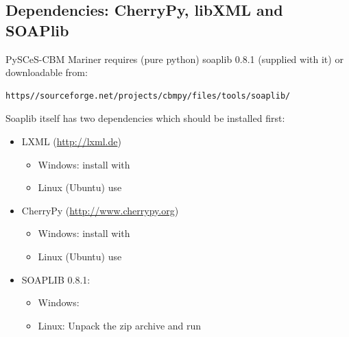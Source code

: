 \documentclass[a4paper,11pt,english]{sphinxmanual}
\begin{document}
\subsection{Dependencies: CherryPy, libXML and SOAPlib}
\label{install_doc:dependencies-cherrypy-libxml-and-soaplib}
PySCeS-CBM Mariner requires (pure python) soaplib 0.8.1 (supplied with it) or
downloadable from:

\begin{Verbatim}[commandchars=\\\{\}]
https//sourceforge.net/projects/cbmpy/files/tools/soaplib/
\end{Verbatim}

Soaplib itself has two dependencies which should be installed first:
\begin{itemize}
\item {} 
LXML (\href{http://lxml.de}{http://lxml.de})
\begin{itemize}
\item {} 
Windows: install with 

\item {} 
Linux (Ubuntu) use 

\end{itemize}

\item {} 
CherryPy (\href{http://www.cherrypy.org}{http://www.cherrypy.org})
\begin{itemize}
\item {} 
Windows: install with 

\item {} 
Linux (Ubuntu) use 

\end{itemize}

\item {} 
SOAPLIB 0.8.1:
\begin{itemize}
\item {} 
Windows: 

\item {} 
Linux: Unpack the zip archive and run 

\end{itemize}

\end{itemize}
\end{document}
